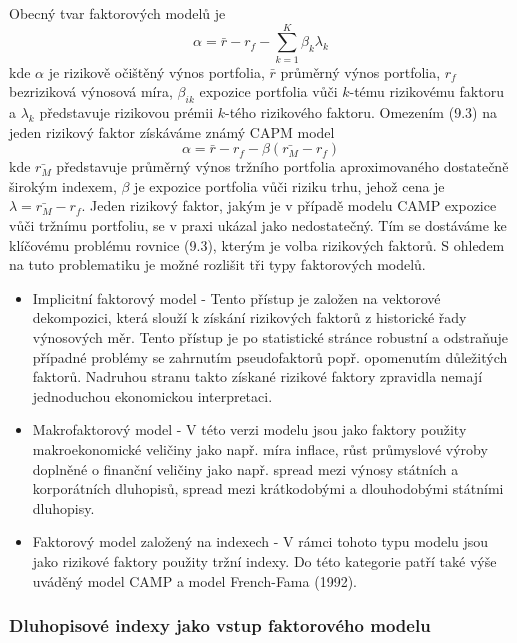 \documentclass[a4paper]{book}
\begin{document}
Obecný tvar faktorových modelů je
\begin{equation}
\alpha = \bar{r} - r_f - \sum_{k=1}^K \beta_{k}\lambda_k
\end{equation}
kde $\alpha$ je rizikově očištěný výnos portfolia, $\bar{r}$ průměrný výnos portfolia, $r_f$ bezriziková výnosová míra, $\beta_{ik}$ expozice portfolia vůči $k$-tému rizikovému faktoru a $\lambda_k$ představuje rizikovou prémii $k$-tého rizikového faktoru. Omezením (9.3) na jeden rizikový faktor získáváme známý CAPM model
\begin{equation*}
\alpha = \bar{r} - r_f - \beta(\bar{r_M} - r_f)
\end{equation*}
kde $\bar{r_M}$ představuje průměrný výnos tržního portfolia aproximovaného dostatečně širokým indexem, $\beta$ je expozice portfolia vůči riziku trhu, jehož cena je $\lambda = \bar{r_M} - r_f$. Jeden rizikový faktor, jakým je v případě modelu CAMP expozice vůči tržnímu portfoliu, se v praxi ukázal jako nedostatečný. Tím se dostáváme ke klíčovému problému rovnice (9.3), kterým je volba rizikových faktorů. S ohledem na tuto problematiku je možné rozlišit tři typy faktorových modelů.
\begin{itemize}
\item Implicitní faktorový model - Tento přístup je založen na vektorové dekompozici, která slouží k získání rizikových faktorů z historické řady výnosových měr. Tento přístup je po statistické stránce robustní a odstraňuje případné problémy se zahrnutím pseudofaktorů popř. opomenutím důležitých faktorů. Nadruhou stranu takto získané rizikové faktory zpravidla nemají jednoduchou ekonomickou interpretaci.
\item Makrofaktorový model - V této verzi modelu jsou jako faktory použity makroekonomické veličiny jako např. míra inflace, růst průmyslové výroby doplněné o finanční veličiny jako např. spread mezi výnosy státních a korporátních dluhopisů, spread mezi krátkodobými a dlouhodobými státními dluhopisy.
\item Faktorový model založený na indexech - V rámci tohoto typu modelu jsou jako rizikové faktory použity tržní indexy. Do této kategorie patří také výše uváděný model CAMP a model French-Fama (1992). 
\end{itemize}

\subsubsection{Dluhopisové indexy jako vstup faktorového modelu}
\end{document}
